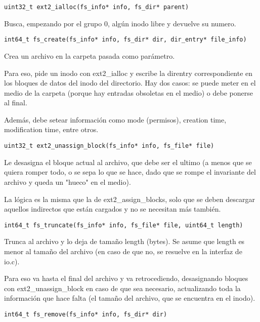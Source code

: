\begin{lstlisting}[style=customc]
uint32_t ext2_ialloc(fs_info* info, fs_dir* parent)
\end{lstlisting}

Busca, empezando por el grupo 0, algún inodo libre y devuelve su numero. 

\begin{lstlisting}[style=customc]
int64_t fs_create(fs_info* info, fs_dir* dir, dir_entry* file_info)
\end{lstlisting}

Crea un archivo en la carpeta pasada como parámetro.

Para eso, pide un inodo con ext2\_ialloc y escribe la direntry correspondiente en los bloques de datos del inodo del directorio. Hay dos casos: se puede meter en el medio de la carpeta (porque hay entradas obsoletas en el medio) o debe ponerse al final.

Además, debe setear información como mode (permisos), creation time, modification time, entre otros.

\begin{lstlisting}[style=customc]
uint32_t ext2_unassign_block(fs_info* info, fs_file* file)
\end{lstlisting}

Le desasigna el bloque actual al archivo, que debe ser el ultimo (a menos que se quiera romper todo, o se sepa lo que se hace, dado que se rompe el invariante del archivo y queda un "hueco" en el medio). 

La lógica es la misma que la de ext2\_assign\_blocks, solo que se deben descargar aquellos indirectos que están cargados y no se necesitan más también.

\begin{lstlisting}[style=customc]
int64_t fs_truncate(fs_info* info, fs_file* file, uint64_t length)
\end{lstlisting}

Trunca al archivo y lo deja de tamaño length (bytes). Se asume que length es menor al tamaño del archivo (en caso de que no, se resuelve en la interfaz de io.c).

Para eso va hasta el final del archivo y va retrocediendo, desasignando bloques con ext2\_unassign\_block en caso de que sea necesario, actualizando toda la información que hace falta (el tamaño del archivo, que se encuentra en el inodo).

\begin{lstlisting}[style=customc]
int64_t fs_remove(fs_info* info, fs_dir* dir)
\end{lstlisting}

